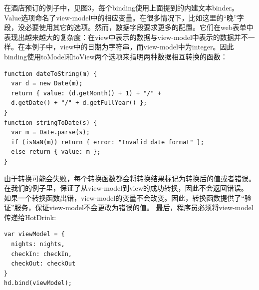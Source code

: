 在酒店预订的例子中，见图3，每个binding使用上面提到的内建文本binder。Value选项命名了view-model中的相应变量。在很多情况下，比如这里的“晚”字段，没必要使用其它的选项。然而，数据字段要求更多的配置。它们在web表单中表现出越来越大的复杂度：在view中表示的数据与view-model中表示的数据并不一样。在本例子中，view中的日期为字符串，而view-model中为integer。因此binding使用toModel和toView两个选项来指明两种数据相互转换的函数：
\begin{verbatim}
function dateToString(m) {
  var d = new Date(m);
  return { value: (d.getMonth() + 1) + "/" +
  d.getDate() + "/" + d.getFullYear() };
}
function stringToDate(s) {
  var m = Date.parse(s);
  if (isNaN(m)) return { error: "Invalid date format" };
  else return { value: m };
}
\end{verbatim}
由于转换可能会失败，每个转换函数都会将转换结果标记为转换后的值或者错误。在我们的例子里，保证了从view-model到view的成功转换，因此不会返回错误。
如果一个转换函数出错，view-model的变量不会改变。因此，转换函数提供了“验证”服务，保证view-model不会更改为错误的值。
最后，程序员必须将view-model传递给HotDrink:
\begin{verbatim}
var viewModel = {
  nights: nights,
  checkIn: checkIn,
  checkOut: checkOut
}
hd.bind(viewModel);
\end{verbatim}

